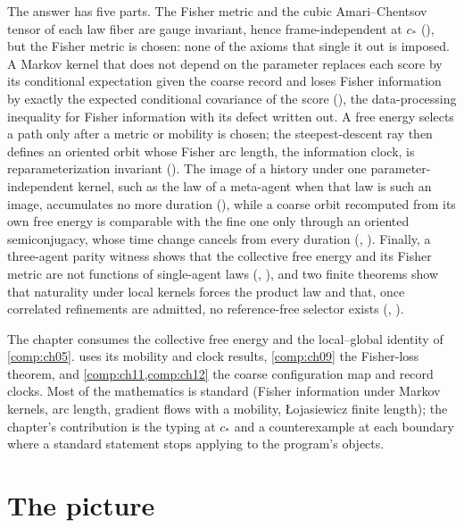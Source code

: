 The answer has five parts. The Fisher metric and the cubic Amari--Chentsov tensor of each law fiber
are gauge invariant, hence frame-independent at $c_*$ (), but
the Fisher metric is chosen: none of the axioms that single it out is imposed. A Markov kernel that
does not depend on the parameter replaces each score by its conditional expectation given the coarse
record and loses Fisher information by exactly the expected conditional covariance of the score
(), the data-processing inequality for Fisher information with its
defect written out. A free energy selects a path only after a metric or mobility is chosen; the
steepest-descent ray then defines an oriented orbit whose Fisher arc length, the information clock,
is reparameterization invariant (). The image of a history under
one parameter-independent kernel, such as the law of a meta-agent when that law is such an image,
accumulates no more duration (), while a coarse orbit
recomputed from its own free energy is comparable with the fine one only through an oriented
semiconjugacy, whose time change cancels from every duration (,
). Finally, a three-agent parity witness shows that the collective
free energy and its Fisher metric are not functions of single-agent laws
(, ), and two finite theorems
show that naturality under local kernels forces the product law and that, once correlated refinements
are admitted, no reference-free selector exists (,
).

The chapter consumes the collective free energy and the local--global identity of \cref{comp:ch05}.
 uses its mobility and clock results, \cref{comp:ch09} the Fisher-loss theorem, and
\cref{comp:ch11,comp:ch12} the coarse configuration map and record clocks. Most of the mathematics is
standard (Fisher information under Markov kernels, arc length, gradient flows with a mobility,
{\L}ojasiewicz finite length); the chapter's contribution is the typing at $c_*$ and a counterexample
at each boundary where a standard statement stops applying to the program's objects.

\section{The picture}
\label{comp:ch07-picture}

